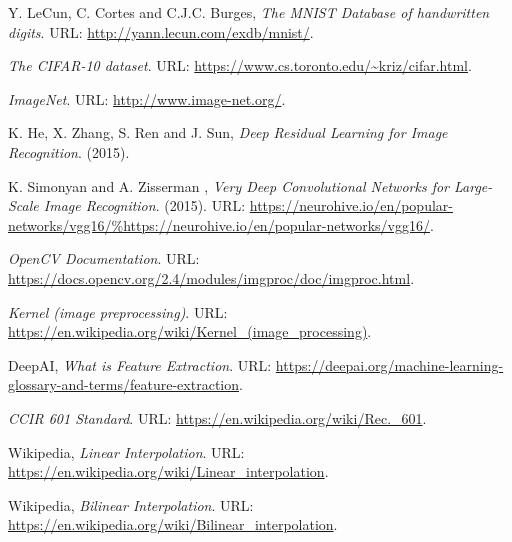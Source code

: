 

\begin{thebibliography}{3}
\frenchspacing



Y. LeCun, C. Cortes and C.J.C. Burges,
\emph{The MNIST Database of handwritten digits}.
URL: \url{http://yann.lecun.com/exdb/mnist/}.


\emph{The CIFAR-10 dataset}.
URL: \url{https://www.cs.toronto.edu/~kriz/cifar.html}.

\emph{ImageNet}.
URL: \url{http://www.image-net.org/}.


K. He, X. Zhang, S. Ren and J. Sun,
\emph{Deep Residual Learning for Image Recognition}.
(2015).


K. Simonyan and A. Zisserman
, \emph{Very Deep Convolutional Networks for Large-Scale Image Recognition}.
(2015).
URL: \url{https://neurohive.io/en/popular-networks/vgg16/%https://neurohive.io/en/popular-networks/vgg16/}.


\emph{OpenCV Documentation}.
URL: \url{https://docs.opencv.org/2.4/modules/imgproc/doc/imgproc.html}.


\emph{Kernel (image preprocessing)}.
URL: \url{https://en.wikipedia.org/wiki/Kernel_(image_processing)}.


DeepAI,
\emph{What is Feature Extraction}.
URL: \url{https://deepai.org/machine-learning-glossary-and-terms/feature-extraction}.


\emph{CCIR 601 Standard}.
URL: \url{https://en.wikipedia.org/wiki/Rec._601}.

Wikipedia,
\emph{Linear Interpolation}.
URL: \url{https://en.wikipedia.org/wiki/Linear_interpolation}.


Wikipedia,
\emph{Bilinear Interpolation}.
URL: \url{https://en.wikipedia.org/wiki/Bilinear_interpolation}.


\end{thebibliography}
